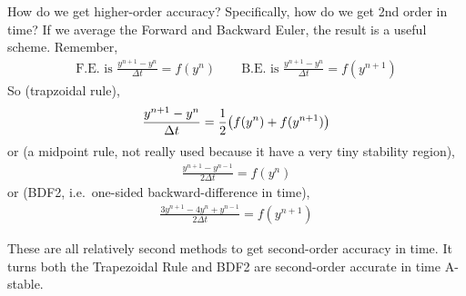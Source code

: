 \documentclass{article}
\newcommand{\Dt}{\Delta t}
\begin{document}
            How do we get higher-order accuracy?  Specifically, how do we get 2nd order in time?  If we average the Forward and Backward Euler, the result is a useful scheme.  Remember,
            \begin{align}
                \text{F.E. is }\frac{y^{n+1} - y^n}{\Dt} = f(y^n) \qquad \text{B.E. is }\frac{y^{n+1} - y^n}{\Dt} = f(y^{n+1})
            \end{align}
            So (trapzoidal rule),
            \begin{align}
                \frac{y^{n+1} - y^n}{\Dt} = \frac{1}{2}\qty(f(y^n) + f(y^{n+1}))
            \end{align}
            or (a midpoint rule, not really used because it have a very tiny stability region),
            \begin{align}
                \frac{y^{n+1} - y^{n-1}}{2\Dt} = f(y^n)
            \end{align}
            or (BDF2, i.e.~one-sided backward-difference in time),
            \begin{align}
                \frac{3y^{n+1} - 4y^n + y^{n-1}}{2\Dt} = f(y^{n+1})
            \end{align}

            These are all relatively second methods to get second-order accuracy in time.  It turns both the Trapezoidal Rule and BDF2 are second-order accurate in time A-stable.
\end{document}
